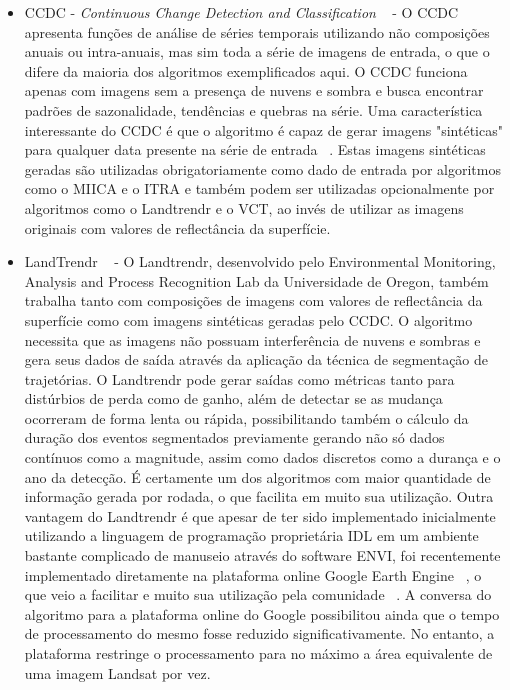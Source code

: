 \documentclass[twocolumn]{article}
\begin{document}
\begin{itemize}
  \item CCDC - \textit{Continuous Change Detection and Classification} ~\cite{ZHU2014152} - O CCDC apresenta funções de análise de séries temporais utilizando não composições anuais ou intra-anuais, mas sim toda a série de imagens de entrada, o que o difere da maioria dos algoritmos exemplificados aqui. O CCDC funciona apenas com imagens sem a presença de nuvens e sombra e busca encontrar padrões de sazonalidade, tendências e quebras na série. Uma característica interessante do CCDC é que o algoritmo é capaz de gerar imagens "sintéticas" para qualquer data presente na série de entrada ~\cite{ZHU201567}. Estas imagens sintéticas geradas são utilizadas obrigatoriamente como dado de entrada por algoritmos como o MIICA e o ITRA e também podem ser utilizadas opcionalmente por algoritmos como o Landtrendr e o VCT, ao invés de utilizar as imagens originais com valores de reflectância da superfície.
  
  \item LandTrendr ~\cite{KENNEDY20102897, KENNEDY2012117} - O Landtrendr, desenvolvido pelo Environmental Monitoring, Analysis and Process Recognition Lab da Universidade de Oregon, também trabalha tanto com composições de imagens com valores de reflectância da superfície como com imagens sintéticas geradas pelo CCDC. O algoritmo necessita que as imagens não possuam interferência de nuvens e sombras e gera seus dados de saída através da aplicação da técnica de segmentação de trajetórias. O Landtrendr pode gerar saídas como métricas tanto para distúrbios de perda como de ganho, além de detectar se as mudança ocorreram de forma lenta ou rápida, possibilitando também o cálculo da duração dos eventos segmentados previamente gerando não só dados contínuos como a magnitude, assim como dados discretos como a durança e o ano da detecção. É certamente um dos algoritmos com maior quantidade de informação gerada por rodada, o que facilita em muito sua utilização. Outra vantagem do Landtrendr é que apesar de ter sido implementado inicialmente utilizando a linguagem de programação proprietária IDL em um ambiente bastante complicado de manuseio através do software ENVI, foi recentemente implementado diretamente na plataforma online Google Earth Engine ~\cite{GORELICK201718}, o que veio a facilitar e muito sua utilização pela comunidade ~\cite{Kennedy2018}. A conversa do algoritmo para a plataforma online do Google possibilitou ainda que o tempo de processamento do mesmo fosse reduzido significativamente. No entanto, a plataforma restringe o processamento para no máximo a área equivalente de uma imagem Landsat por vez.
  

\end{itemize}
\end{document}
